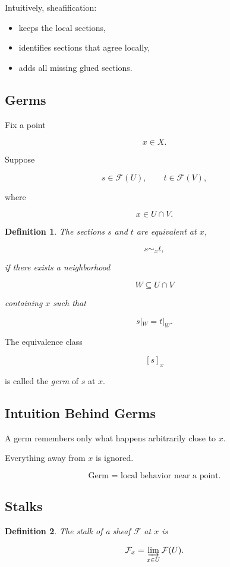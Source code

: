 \documentclass[12pt,a4paper]{article}
\theoremstyle{notespace}
\newtheorem{definition}{Definition}[subsection]
\begin{document}
Intuitively, sheafification:

\begin{itemize}
	\item keeps the local sections,
	\item identifies sections that agree locally,
	\item adds all missing glued sections.
\end{itemize}

\subsection{Germs}

Fix a point

\[
x\in X.
\]

Suppose

\[
s\in \mathcal F(U),
\qquad
t\in \mathcal F(V),
\]

where

\[
x\in U\cap V.
\]

\begin{definition}
	The sections \(s\) and \(t\) are equivalent at \(x\),
	
	\[
	s\sim_x t,
	\]
	
	if there exists a neighborhood
	
	\[
	W\subseteq U\cap V
	\]
	
	containing \(x\) such that
	
	\[
	s|_W=t|_W.
	\]
\end{definition}

The equivalence class

\[
[s]_x
\]

is called the \emph{germ} of \(s\) at \(x\).

\subsection{Intuition Behind Germs}

A germ remembers only what happens arbitrarily close to \(x\).

Everything away from \(x\) is ignored.

\[
\boxed{
	\text{Germ = local behavior near a point.}
}
\]

\subsection{Stalks}

\begin{definition}
	The stalk of a sheaf \(\mathcal F\) at \(x\) is
	
	\[
	\mathcal F_x
	=
	\varinjlim_{x\in U}
	\mathcal F(U).
	\]
\end{definition}
\end{document}
